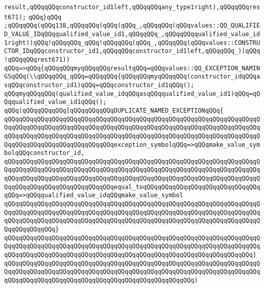 \verb|result,qQQqqQQqconstructor_id1left,qQQqqQQqany_type1right),qQQqqQQqrest671);|\newline
\verb|qQQq}qQQq|\newline
\verb|;qQQqqQQq(qQQq138,qQQqqQQq(qQQq(qQQq_,qQQqqQQq(qQQqvalues::QQ_QUALIFIED_VALUE_IDqQQqqualified_value_id1,qQQqqQQq_,qQQqqQQqqualified_value_id1right))qQQq!qQQqqQQq_qQQq!qQQqqQQq(qQQq_,qQQqqQQq(qQQqvalues::CONSTRUCTOR_IDqQQqconstructor_id1,qQQqqQQqconstructor_id1left,qQQqqQQq_))qQQq!qQQqqQQqrest671))|\newline
\verb|qQQq=>qQQq{qQQqqQQqmyqQQqqQQqresultqQQq=qQQqvalues::QQ_EXCEPTION_NAMINGSqQQq(\\qQQqqQQq_qQQq=qQQqqQQq{qQQqqQQqmyqQQqqQQq(constructor_idqQQqasqQQqconstructor_id1)qQQq=qQQqconstructor_id1qQQq();|\newline
\verb|qQQqmyqQQqqQQq(qualified_value_idqQQqasqQQqqualified_value_id1)qQQq=qQQqqualified_value_id1qQQq();|\newline
\newline
\verb|qQQq(qQQqqQQqqQQq[qQQqqQQqqQQqDUPLICATE_NAMED_EXCEPTIONqQQq{|\newline
\verb|qQQqqQQqqQQqqQQqqQQqqQQqqQQqqQQqqQQqqQQqqQQqqQQqqQQqqQQqqQQqqQQqqQQqqQQqqQQqqQQqqQQqqQQqqQQqqQQqqQQqqQQqqQQqqQQqqQQqqQQqqQQqqQQqqQQqqQQqqQQqqQQqqQQqqQQqqQQqqQQqqQQqqQQqqQQqqQQqqQQqqQQqqQQqqQQqqQQqqQQqqQQqqQQqqQQqqQQqqQQqqQQqqQQqqQQqqQQqqQQqexception_symbolqQQq=>qQQqmake_value_symbolqQQqconstructor_id,|\newline
\verb|qQQqqQQqqQQqqQQqqQQqqQQqqQQqqQQqqQQqqQQqqQQqqQQqqQQqqQQqqQQqqQQqqQQqqQQqqQQqqQQqqQQqqQQqqQQqqQQqqQQqqQQqqQQqqQQqqQQqqQQqqQQqqQQqqQQqqQQqqQQqqQQqqQQqqQQqqQQqqQQqqQQqqQQqqQQqqQQqqQQqqQQqqQQqqQQqqQQqqQQqqQQqqQQqqQQqqQQqqQQqqQQqqQQqqQQqqQQqqQQqequal_toqQQqqQQqqQQqqQQqqQQqqQQqqQQqqQQqqQQq=>qQQqqualified_value_idqQQqmake_value_symbol|\newline
\verb|qQQqqQQqqQQqqQQqqQQqqQQqqQQqqQQqqQQqqQQqqQQqqQQqqQQqqQQqqQQqqQQqqQQqqQQqqQQqqQQqqQQqqQQqqQQqqQQqqQQqqQQqqQQqqQQqqQQqqQQqqQQqqQQqqQQqqQQqqQQqqQQqqQQqqQQqqQQqqQQqqQQqqQQqqQQqqQQqqQQqqQQqqQQqqQQqqQQqqQQqqQQqqQQqqQQqqQQqqQQqqQQq}|\newline
\verb|qQQqqQQqqQQqqQQqqQQqqQQqqQQqqQQqqQQqqQQqqQQqqQQqqQQqqQQqqQQqqQQqqQQqqQQqqQQqqQQqqQQqqQQqqQQqqQQqqQQqqQQqqQQqqQQqqQQqqQQqqQQqqQQqqQQqqQQqqQQqqQQqqQQqqQQqqQQqqQQqqQQqqQQqqQQqqQQqqQQqqQQqqQQqqQQqqQQqqQQqqQQqqQQq]|\newline
\verb|qQQqqQQqqQQqqQQqqQQqqQQqqQQqqQQqqQQqqQQqqQQqqQQqqQQqqQQqqQQqqQQqqQQqqQQqqQQqqQQqqQQqqQQqqQQqqQQqqQQqqQQqqQQqqQQqqQQqqQQqqQQqqQQqqQQqqQQqqQQqqQQqqQQqqQQqqQQqqQQqqQQqqQQqqQQqqQQqqQQqqQQqqQQqqQQq)|\newline
